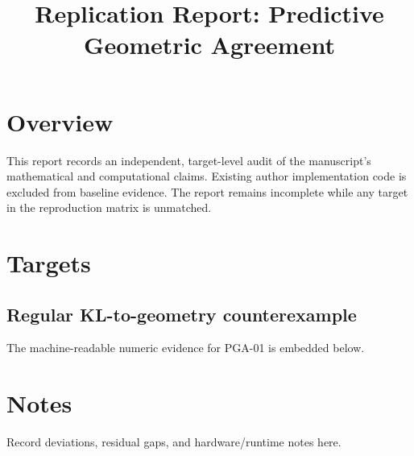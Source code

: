 \documentclass{article}
\title{Replication Report: Predictive Geometric Agreement}
\author{}
\date{}
\begin{document}
\maketitle

\section{Overview}
This report records an independent, target-level audit of the manuscript's
mathematical and computational claims. Existing author implementation code is
excluded from baseline evidence. The report remains incomplete while any target
in the reproduction matrix is unmatched.

\section{Targets}

\subsection{Regular KL-to-geometry counterexample}
\label{tab:pga-01}
The machine-readable numeric evidence for PGA-01 is embedded below.



\section{Notes}
Record deviations, residual gaps, and hardware/runtime notes here.



\end{document}
